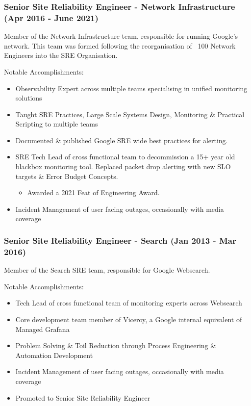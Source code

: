 \documentclass[a4paper, 10pt] {article}
\begin{document}
\subsubsection*{Senior Site Reliability Engineer - Network Infrastructure (Apr 2016 - June 2021)}

Member of the Network Infrastructure team, responsible for running Google's network. This team was formed
following the reorganisation of ~100 Network Engineers into the SRE Organisation.

\vspace{3mm}  %

Notable Accomplishments:

\begin{itemize}
  \item Observability Expert across multiple teams specialising in unified monitoring solutions
  \item Taught SRE Practices, Large Scale Systems Design, Monitoring \& Practical Scripting to multiple teams
  \item Documented \& published Google SRE wide best practices for alerting.
  \item SRE Tech Lead of cross functional team to decommission a 15+ year old blackbox monitoring tool. Replaced packet drop alerting with new SLO targets \& Error Budget Concepts.
  \begin{itemize}
     \item Awarded a 2021 Feat of Engineering Award.
  \end{itemize}
  \item Incident Management of user facing outages, occasionally with media coverage
\end{itemize}

\subsubsection*{Senior Site Reliability Engineer - Search (Jan 2013 - Mar 2016)}

Member of the Search SRE team, responsible for Google Websearch.

\vspace{3mm}  %

Notable Accomplishments:

\begin{itemize}
  \item Tech Lead of cross functional team of monitoring experts across Websearch
  \item Core development team member of Viceroy, a Google internal equivalent of Managed Grafana
  \item Problem Solving \& Toil Reduction through Process Engineering \& Automation Development
  \item Incident Management of user facing outages, occasionally with media coverage
  \item Promoted to Senior Site Reliability Engineer
\end{itemize}
\end{document}
